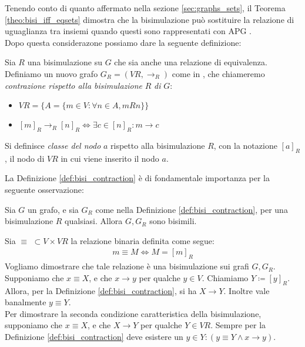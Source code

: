 Tenendo conto di quanto affermato nella sezione \ref{sec:graphs_sets}, il Teorema \ref{theo:bisi_iff_eqsets} dimostra che la bisimulazione può sostituire la
relazione di uguaglianza tra insiemi quando questi sono rappresentati con APG \cite{dovier}.\\
Dopo questa considerazone possiamo dare la seguente definizione:
\begin{definition}
    Sia $R$ una bisimulazione su $G$ che sia anche una relazione di equivalenza. Definiamo un nuovo grafo $G_R = (VR, \to_R)$ come in \cite{gentilini}, che chiameremo \emph{contrazione rispetto alla bisimulazione} $R$ \emph{di} $G$:
    \begin{itemize}
        \item $VR = \{A = \{m \in V: \forall n \in A, m R n\}\}$
        \item $[m]_R \to_R [n]_R \iff \exists c \in [n]_R : m \to c$
    \end{itemize}
    Si definisce \emph{classe del nodo} $a$ rispetto alla bisimulazione $R$, con la notazione $[a]_R$, il nodo di $VR$ in cui viene inserito il nodo $a$.
    \label{def:bisi_contraction}
\end{definition}
La Definizione \ref{def:bisi_contraction} è di fondamentale importanza per la seguente osservazione:
\begin{proposition}
    Sia $G$ un grafo, e sia $G_R$ come nella Definizione \ref{def:bisi_contraction}, per una bisimulazione $R$ qualsiasi. Allora $G, G_R$ sono bisimili.
    \label{prop:bisi_cont_bisi}
\end{proposition}
\begin{proof2}
    Sia $\equiv \,\,\subset V\times VR$ la relazione binaria definita come segue:
    \begin{gather*}
        m \equiv M \iff M = [m]_R
    \end{gather*}
    Vogliamo dimostrare che tale relazione è una bisimulazione sui grafi $G, G_R$.\\
    Supponiamo che $x \equiv X$, e che $x \to y$ per qualche $y \in V$. Chiamiamo $Y \coloneqq [y]_R$. Allora, per la Definizione \ref{def:bisi_contraction}, si ha $X \to Y$. Inoltre vale banalmente $y \equiv Y$.\\
    Per dimostrare la seconda condizione caratteristica della bisimulazione, supponiamo che $x \equiv X$, e che $X \to Y$ per qualche $Y \in VR$. Sempre per la Definizione \ref{def:bisi_contraction} deve esistere un $y \in Y : (y \equiv Y \land x \to y)$.
\end{proof2}
